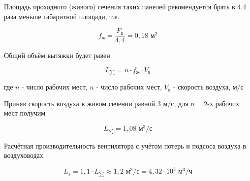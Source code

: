 
Площадь проходного (живого) сечения таких панелей рекомендуется брать в 4.4
раза меньше габаритной площади, т.е.

\begin{equation}
\label{alive_section_are}
    f_\text{ж} = \frac{F_\text{п}}{4,4} = 0,18 \text{ м}^2
\end{equation}

Общий объём вытяжки будет равен

\begin{equation}
\label{overall_sucktion_volume}
    L_{\sum} = n \cdot f_\text{ж} \cdot V_\text{в}
\end{equation}

где $n$ - число рабочих мест,
$n$ - число рабочих мест,
$V_\text{в}$ - скорость воздуха, $\text{м/с}$

Приняв скорость воздуха в живом сечении равной 3 $\text{м/с}$, для $n = 2$-х
рабочих мест получим

$$
    L_{\sum} = 1,08 \text{ м}^3 / \text{с}
$$

Расчётная производительность вентилятора с учётом потерь и подсоса воздуха
в воздуховодах

\begin{equation}
\label{fan_productivity}
    L_s = 1,1 \cdot L_{\sum} \approx 1,2 \text{ м}^3 / \text{с} = 4,32 \cdot 10^3 \text{ м}^3 / \text{ч}
\end{equation}

